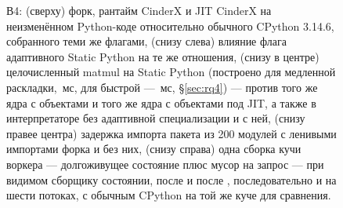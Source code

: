 \begin{figure}[t]
  \centering
  \caption{В4: (сверху) форк, рантайм CinderX и JIT CinderX на неизменённом Python-коде
    относительно обычного CPython 3.14.6, собранного теми же флагами, (снизу слева) влияние
    флага адаптивного Static Python на те же отношения, (снизу в центре) целочисленный matmul на
    Static Python  (построено для медленной раскладки, \,мс, для быстрой ---
    \,мс, \S\ref{sec:rq4}) --- против того же ядра с объектами и того же ядра с объектами
    под JIT, а также в интерпретаторе без адаптивной специализации и с ней, (снизу правее центра) задержка импорта пакета из 200 модулей с ленивыми импортами
    форка и без них, (снизу справа) одна сборка кучи воркера --- долгоживущее состояние плюс
    мусор на запрос --- при видимом сборщику состоянии, после  и после
    , последовательно и на шести потоках, с обычным CPython на той же
    куче для сравнения.}
  \label{fig:cinder}
\end{figure}

\begin{table}[t]
  \centering
  \caption{В4: что на самом деле даёт открытый CinderX, собранный и запущенный нативно на хосте из
    таблицы~\ref{tab:platform}.}
  \label{tab:cinder}
  \small
  
\end{table}


